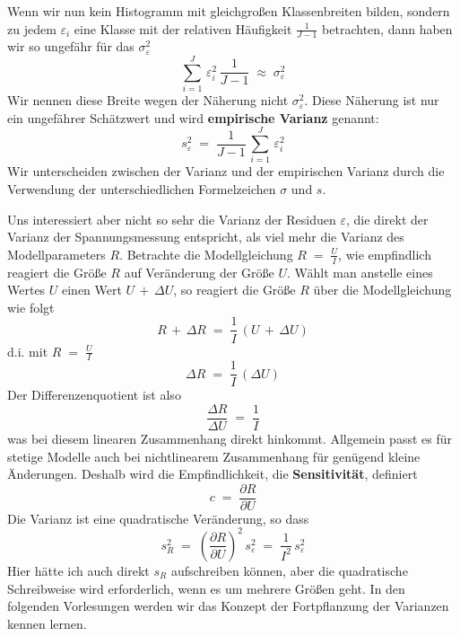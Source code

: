 \documentclass[a4paper,12pt,DIV=15]{scrartcl}
\begin{document}
Wenn wir nun kein Histogramm mit gleichgroßen Klassenbreiten bilden, sondern zu jedem $\varepsilon_i$ eine Klasse mit der relativen
Häufigkeit $\frac{1}{J-1}$ betrachten, dann haben wir so ungefähr für das $\sigma_{\varepsilon}^2$
\begin{equation}
\sum_{i=1}^J \, \varepsilon_i^2 \,  \frac{1}{J-1}  \; \approx \; \sigma_{\varepsilon}^2
\end{equation}
Wir nennen diese Breite wegen der Näherung nicht $\sigma_{\varepsilon}^2$. Diese Näherung ist nur ein ungefährer Schätzwert 
und wird \textbf{empirische Varianz} genannt:
\begin{equation}
s_{\varepsilon}^2 \; = \; \frac{1}{J-1} \, \sum_{i=1}^J \, \varepsilon_i^2
\end{equation}
Wir unterscheiden zwischen der Varianz und der empirischen Varianz durch die Verwendung der
unterschiedlichen Formelzeichen $\sigma$ und $s$.

Uns interessiert aber nicht so sehr die Varianz der Residuen $\varepsilon$, die direkt der Varianz
der Spannungsmessung entspricht,
als viel mehr die Varianz des Modellparameters $R$.
Betrachte die Modellgleichung $R \; = \; \frac{U}{I}$, wie empfindlich reagiert die Größe $R$ auf Veränderung der Größe $U$.
Wählt man anstelle eines Wertes $U$ einen Wert $U \, + \, \Delta U$, so reagiert die Größe $R$ über die Modellgleichung wie folgt
\begin{equation}
R \, + \, \Delta R \; = \; \frac{1}{I} \, \left( U \, + \, \Delta U \right)
\end{equation}
d.i. mit $R \; = \; \frac{U}{I}$
\begin{equation}
\Delta R \; = \; \frac{1}{I} \, \left( \Delta U \right)
\end{equation}
Der Differenzenquotient ist also
\begin{equation}
\frac{\Delta R}{\Delta U} \; = \; \frac{1}{I}
\end{equation}
was bei diesem linearen Zusammenhang direkt hinkommt. Allgemein passt es für stetige Modelle auch bei nichtlinearem Zusammenhang
für genügend kleine Änderungen. Deshalb wird die Empfindlichkeit, die \textbf{Sensitivität}, definiert
\begin{equation}
c  \; = \; \frac{\partial R}{\partial U}
\end{equation}
Die Varianz ist eine quadratische Veränderung, so dass
\begin{equation}
s_R^2  \; = \; \left(\frac{\partial R}{\partial U}\right)^2 \, s_{\varepsilon}^2 \; = \; \frac{1}{I^2} \, s_{\varepsilon}^2
\end{equation}
Hier hätte ich auch direkt $s_R$ aufschreiben können, aber die quadratische Schreibweise wird erforderlich, wenn es um mehrere Größen geht. In den folgenden Vorlesungen werden wir das Konzept der Fortpflanzung der Varianzen kennen lernen.
\end{document}
